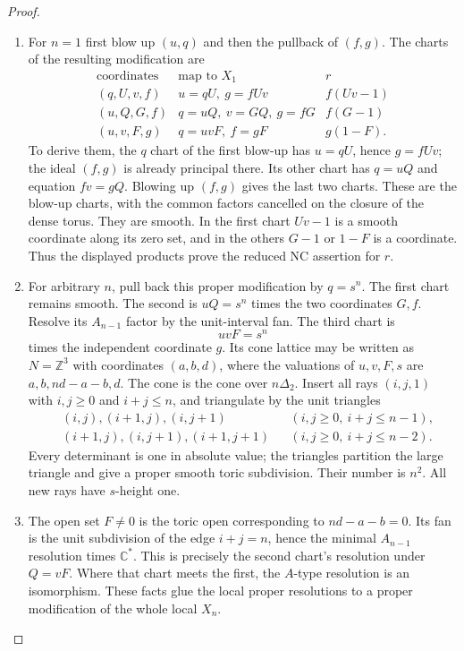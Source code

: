 \begin{proof}
\begin{enumerate}[label=\arabic*.,leftmargin=*]
\item For $n=1$ first blow up $(u,q)$ and then the pullback
of $(f,g)$. The charts of the resulting modification are
\[
\begin{array}{c|c|c}
 \text{coordinates}&\text{map to }X_1&r\\\hline
 (q,U,v,f)&u=qU,\ g=fUv&f(Uv-1)\\
 (u,Q,G,f)&q=uQ,\ v=GQ,\ g=fG&f(G-1)\\
 (u,v,F,g)&q=uvF,\ f=gF&g(1-F).
\end{array}
\]
To derive them, the $q$ chart of the first blow-up
has $u=qU$, hence $g=fUv$; the ideal $(f,g)$ is
already principal there. Its other chart has
$q=uQ$ and equation $fv=gQ$. Blowing up $(f,g)$
gives the last two charts. These are the 
blow-up charts, with the common factors cancelled
on the closure of the dense torus.
They are smooth. In the first chart $Uv-1$ is a
smooth coordinate along its zero set, and in the
others $G-1$ or $1-F$ is a coordinate. Thus the
displayed products prove the reduced NC assertion
for $r$.

\item For arbitrary $n$, pull back this proper modification
by $q=s^n$. The first chart remains smooth. The
second is $uQ=s^n$ times the two coordinates $G,f$.
Resolve its $A_{n-1}$ factor by the unit-interval fan.
The third chart is
\[
 uvF=s^n
\]
times the independent coordinate $g$. Its cone lattice
may be written as $N=\mathbb Z^3$ with coordinates
$(a,b,d)$, where the valuations of $u,v,F,s$ are
$a,b,nd-a-b,d$. The cone is the cone over
$n\Delta_2$. Insert all rays $(i,j,1)$ with
$i,j\ge0$ and $i+j\le n$, and triangulate by the
unit triangles
\[
\begin{aligned}
 &(i,j),(i+1,j),(i,j+1) &&(i,j\ge0,\ i+j\le n-1),\\
 &(i+1,j),(i,j+1),(i+1,j+1)
                       &&(i,j\ge0,\ i+j\le n-2).
\end{aligned}
\]
Every determinant is one in absolute value; the
triangles partition the large triangle and give a
proper smooth toric subdivision. Their number is
$n^2$. All new rays have $s$-height one.

\item The open set $F\ne0$ is the toric open corresponding
to $nd-a-b=0$. Its fan is the unit subdivision of
the edge $i+j=n$, hence the minimal $A_{n-1}$
resolution times $\mathbb C^*$. This is precisely
the second chart's resolution under $Q=vF$.
Where that chart meets the first, the $A$-type
resolution is an isomorphism. These facts glue
the local proper resolutions to a proper
modification of the whole local $X_n$.


\end{enumerate}
\end{proof}
